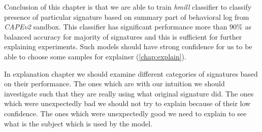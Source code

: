 Conclusion of this chapter is that we are able to train \emph{hmill} classifier to classify presence of particular signature based on summary part of behavioral log from \emph{CAPEv2} sandbox. This classifier has significant performance more than $90\%$ as balanced accuracy for majority of signatures and this is sufficient for further explaining experiments. Such models should have strong confidence for us to be able to choose some samples for explainer (\ref{chap:explain}). 


In explanation chapter we should examine different categories of signatures based on their performance. The ones which are with our intuition we should investigate such that they are really using what original signature did. The ones which were unexpectedly bad we should not try to explain because of their low confidence. The ones which were unexpectedly good we need to explain to see what is the subject which is used by the model.





